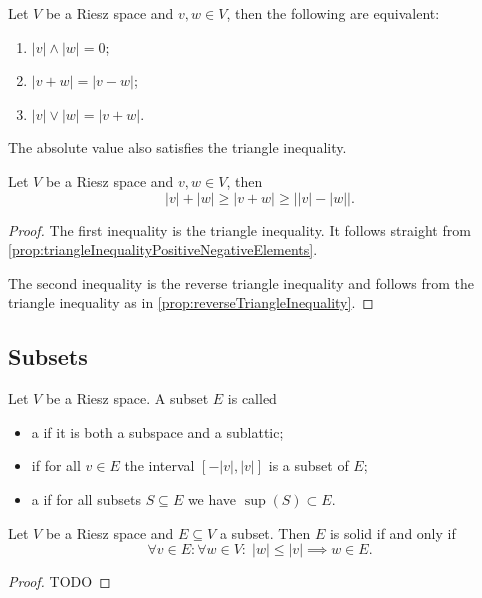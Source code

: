 \begin{corollary}
Let $V$ be a Riesz space and $v,w\in V$, then the following are equivalent:
\begin{enumerate}
\item $|v|\wedge |w| = 0$;
\item $|v+w| = |v-w|$;
\item $|v|\vee |w| = |v+w|$.
\end{enumerate}
\end{corollary}

The absolute value also satisfies the triangle inequality.
\begin{proposition}
Let $V$ be a Riesz space and $v,w\in V$, then
\[ |v| + |w| \geq \big|v+w\big| \geq \big||v|-|w|\big|. \]
\end{proposition}
\begin{proof}
The first inequality is the triangle inequality. It follows straight from \ref{prop:triangleInequalityPositiveNegativeElements}.

The second inequality is the reverse triangle inequality and follows from the triangle inequality as in \ref{prop:reverseTriangleInequality}.
\end{proof}

\subsection{Subsets}
\begin{definition}
Let $V$ be a Riesz space. A subset $E$ is called
\begin{itemize}
\item a  if it is both a subspace and a sublattic;
\item {} if for all $v\in E$ the interval $[-|v|,|v|]$ is a subset of $E$;
\item a  if for all subsets $S\subseteq E$ we have $\sup(S) \subset E$. 
\end{itemize}
\end{definition}

\begin{lemma}
Let $V$ be a Riesz space and $E\subseteq V$ a subset. Then $E$ is solid \textup{if and only if}
\[ \forall v\in E: \forall w\in V: \; |w|\leq |v| \implies w\in E. \]
\end{lemma}
\begin{proof}
TODO
\end{proof}

